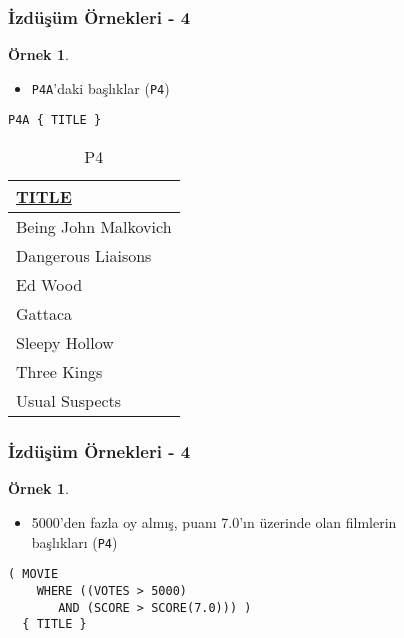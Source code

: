 \documentclass[dvipsnames]{beamer}
\theoremstyle{definition}
\theoremstyle{example}
\newtheorem{ornek}[theorem]{Örnek}
\theoremstyle{plain}
\begin{document}
\begin{frame}[fragile]
  \frametitle{İzdüşüm Örnekleri - 4}

  \begin{ornek}
    \begin{itemize}
      \item \texttt{P4A}'daki başlıklar (\texttt{P4})
    \end{itemize}

    \begin{lstlisting}
P4A { TITLE }
    \end{lstlisting}

    \pause
    \vspace{-10pt}
    \begin{tiny}
    \begin{table}
      \caption{P4}
      \begin{tabular}{|l|}\hline
\underline{TITLE}   \\[2pt]\hline\hline
Being John Malkovich\\\hline
Dangerous Liaisons  \\\hline
Ed Wood             \\\hline
Gattaca             \\\hline
Sleepy Hollow       \\\hline
Three Kings         \\\hline
Usual Suspects      \\\hline
      \end{tabular}
    \end{table}
    \end{tiny}
  \end{ornek}
\end{frame}

\begin{frame}[fragile]
  \frametitle{İzdüşüm Örnekleri - 4}

  \begin{ornek}
    \begin{itemize}
      \item 5000'den fazla oy almış, puanı 7.0'ın üzerinde olan filmlerin\\
        başlıkları (\texttt{P4})
    \end{itemize}

    \begin{lstlisting}
( MOVIE
    WHERE ((VOTES > 5000)
       AND (SCORE > SCORE(7.0))) )
  { TITLE }
    \end{lstlisting}
  \end{ornek}
\end{frame}
\end{document}
